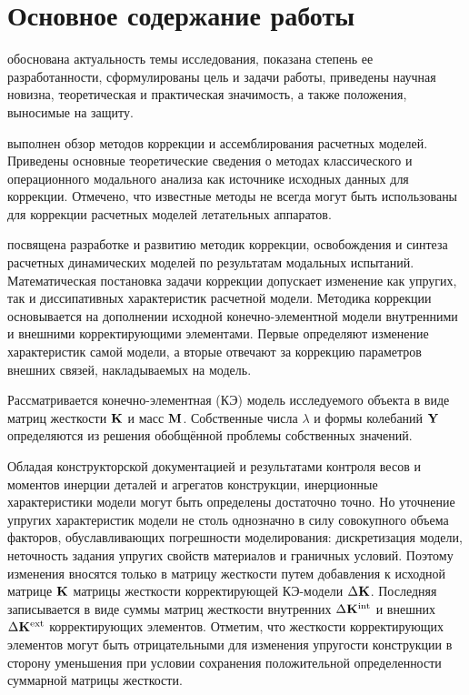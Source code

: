 
\section*{Основное содержание работы}


 обоснована актуальность темы исследования, показана степень ее разработанности, сформулированы цель и задачи работы, приведены научная новизна, теоретическая и практическая значимость, а также положения, выносимые на защиту.


 выполнен обзор методов коррекции и ассемблирования расчетных моделей. Приведены основные теоретические сведения о методах классического и операционного модального анализа как источнике исходных данных для коррекции. Отмечено, что известные методы не всегда могут быть использованы для коррекции расчетных моделей летательных аппаратов.


 посвящена разработке и развитию методик коррекции, освобождения и синтеза расчетных динамических моделей по результатам модальных испытаний. Математическая постановка задачи коррекции допускает изменение как упругих, так и диссипативных характеристик расчетной модели. Методика коррекции основывается на дополнении исходной конечно-элементной модели внутренними и внешними корректирующими элементами. Первые определяют изменение характеристик самой модели, а вторые отвечают за коррекцию параметров внешних связей, накладываемых на модель.

Рассматривается конечно-элементная (КЭ) модель исследуемого объекта в виде матриц жесткости $ \mathbf{K} $ и масс $ \mathbf{M} $. Собственные числа $ \lambda $ и формы колебаний $ \mathbf{Y} $ определяются из решения обобщённой проблемы собственных значений.

Обладая конструкторской документацией и результатами контроля весов и моментов инерции деталей и агрегатов конструкции, инерционные характеристики модели могут быть определены достаточно точно. Но уточнение упругих характеристик модели не столь однозначно в силу совокупного объема факторов, обуславливающих погрешности моделирования: дискретизация модели, неточность задания упругих свойств материалов и граничных условий. Поэтому изменения вносятся только в матрицу жесткости путем добавления к исходной матрице $ \mathbf{K} $ матрицы жесткости корректирующей КЭ-модели $ \Delta \mathbf{K} $. Последняя записывается в виде суммы матриц жесткости внутренних $ \Delta \mathbf{K} ^ {\text{int}} $ и внешних $ \Delta \mathbf{K} ^ {\text{ext}} $ корректирующих элементов. Отметим, что жесткости корректирующих элементов могут быть отрицательными для изменения упругости конструкции в сторону уменьшения при условии сохранения положительной определенности суммарной матрицы жесткости. 

